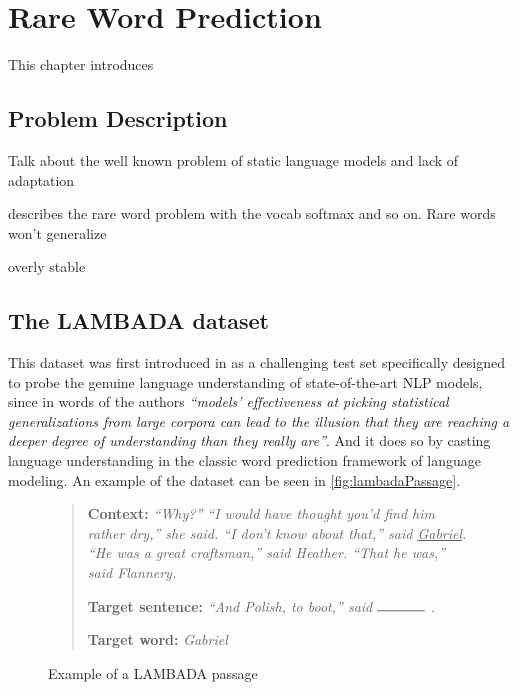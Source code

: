 \chapter{Rare Word Prediction}

This chapter introduces


\section{Problem Description}
\label{sec:problemRare}

Talk about the well known problem of static language models and lack of adaptation

\cite{gulcehre2016pointing} describes the rare word problem with the vocab softmax and so on. Rare words won't generalize

overly stable

\section{The LAMBADA dataset}
\label{sec:lambada}

This dataset was first introduced in \cite{paperno2016lambada} as a challenging test set specifically designed to probe the genuine language understanding of state-of-the-art NLP models, since in words of the authors \textit{``models' effectiveness at picking statistical generalizations from large corpora can lead to the illusion that they are reaching a deeper degree of understanding than they really are''}. And it does so by casting language understanding in
the classic word prediction framework of language modeling. An example of the dataset can be seen in \autoref{fig:lambadaPassage}.

\begin{figure}[H]
	\begin{quote} 		
		 \textbf{Context:} \textit{``Why?'' ``I would have thought you'd find him rather dry,'' she said. ``I don’t know about that,'' said \underline{Gabriel}. ``He was a great craftsman,'' said Heather. ``That he was,'' said Flannery.} \par
		\textbf{Target sentence:} \textit{``And Polish, to boot,'' said $\rule{1.2cm}{0.15mm}$} . \par
		\textbf{Target word:} \textit{Gabriel}
	\end{quote}
	\caption{Example of a LAMBADA passage} \label{fig:lambadaPassage}
\end{figure}

